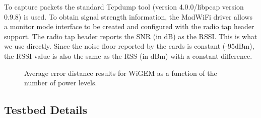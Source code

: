 To capture packets the standard Tcpdump tool (version 4.0.0/libpcap version 0.9.8) is used. To obtain signal strength information, the MadWiFi driver allows a
monitor mode interface to be created and configured with the radio tap header support. 
The radio tap header reports the SNR (in dB) as the RSSI. This is what we use directly. 
Since the noise floor reported by the cards is constant (-95dBm), the RSSI value 
is also the same as the RSS (in dBm) with a constant difference. 


\begin{figure}
	\centering
	\caption{Average error distance results for WiGEM
	as a function of the number of power levels.}
	\label{fig:powerlevelsvserrordistance}
\end{figure}

\subsection{Testbed Details}
\label{subsec:testbeddetails}


